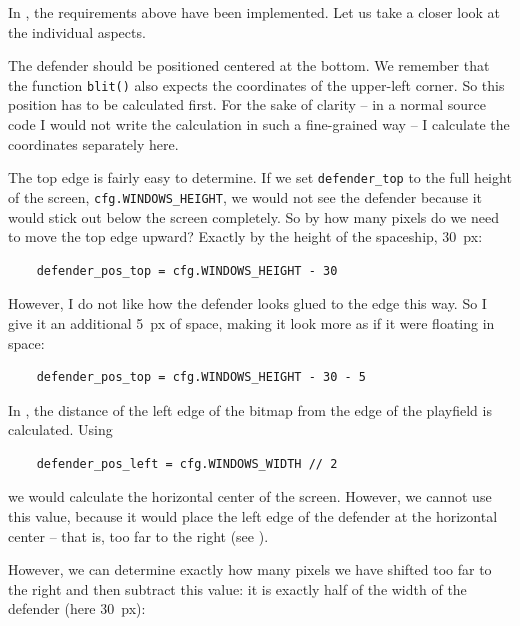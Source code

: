 
In , the requirements above have been implemented. Let us take a closer look at the individual aspects. 

The defender should be positioned centered at the bottom. We remember that the function \texttt{blit()} also expects the coordinates of the upper-left corner. So this position has to be calculated first. For the sake of clarity -- in a normal source code I would not write the calculation in such a fine-grained way -- I calculate the coordinates separately here.

The top edge is fairly easy to determine. If we set \texttt{defender\_top} to the full height of the screen, \texttt{cfg.WINDOWS\_HEIGHT}, we would not see the defender because it would stick out below the screen completely. So by how many pixels do we need to move the top edge upward? Exactly by the height of the spaceship, \SI{30}{px}:


\lstset{firstnumber=18}
\begin{lstlisting}
	defender_pos_top = cfg.WINDOWS_HEIGHT - 30
\end{lstlisting}

However, I do not like how the defender looks glued to the edge this way. So I give it an additional \SI{5}{px} of space, making it look more as if it were floating in space:

\lstset{firstnumber=18}
\begin{lstlisting}
	defender_pos_top = cfg.WINDOWS_HEIGHT - 30 - 5
\end{lstlisting}

In , the distance of the left edge of the bitmap from the edge of the playfield is calculated. Using


\lstset{firstnumber=17}
\begin{lstlisting}
	defender_pos_left = cfg.WINDOWS_WIDTH // 2
\end{lstlisting}

we would calculate the horizontal center of the screen. However, we cannot use this value, because it would place the left edge of the defender at the horizontal center -- that is, too far to the right (see ).


However, we can determine exactly how many pixels we have shifted too far to the right and then subtract this value: it is exactly half of the width of the defender (here \SI{30}{px}):


